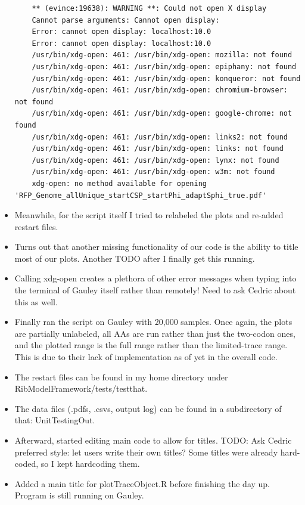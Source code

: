 \documentclass[12pt,hyperref]{labbook}
\newcommand{\sep}{\discretionary{}{}{}} %
\begin{document}
\begin{itemize}
\begin{lstlisting}
    ** (evince:19638): WARNING **: Could not open X display
    Cannot parse arguments: Cannot open display: 
    Error: cannot open display: localhost:10.0
    Error: cannot open display: localhost:10.0
    /usr/bin/xdg-open: 461: /usr/bin/xdg-open: mozilla: not found
    /usr/bin/xdg-open: 461: /usr/bin/xdg-open: epiphany: not found
    /usr/bin/xdg-open: 461: /usr/bin/xdg-open: konqueror: not found
    /usr/bin/xdg-open: 461: /usr/bin/xdg-open: chromium-browser: not found
    /usr/bin/xdg-open: 461: /usr/bin/xdg-open: google-chrome: not found
    /usr/bin/xdg-open: 461: /usr/bin/xdg-open: links2: not found
    /usr/bin/xdg-open: 461: /usr/bin/xdg-open: links: not found
    /usr/bin/xdg-open: 461: /usr/bin/xdg-open: lynx: not found
    /usr/bin/xdg-open: 461: /usr/bin/xdg-open: w3m: not found
    xdg-open: no method available for opening 'RFP_Genome_allUnique_startCSP_startPhi_adaptSphi_true.pdf'
    \end{lstlisting}
    \item Meanwhile, for the script itself I tried to relabeled the plots and re-added restart files.
    \item Turns out that another missing functionality of our code is the ability to title most of our plots. 
    Another TODO after I finally get this running.
    \item Calling xdg-open creates a plethora of other error messages when typing into the terminal of Gauley itself rather than remotely! 
    Need to ask Cedric about this as well.
    \item Finally ran the script on Gauley with 20,000 samples.
    Once again, the plots are partially unlabeled, all AAs are run rather than just the two-codon ones, and the plotted range is the full range rather than the limited-trace range.
    This is due to their lack of implementation as of yet in the overall code.
    \item The restart files can be found in my home directory under Rib\sep Model\sep Framework\sep/\sep tests\sep /\sep testthat\sep.
    \item The data files (.pdfs, .csvs, output log) can be found in a subdirectory of that: Unit\sep Testing\sep Out.
    \item Afterward, started editing main code to allow for titles.
    TODO: Ask Cedric preferred style: let users write their own titles?
    Some titles were already hard-coded, so I kept hardcoding them.
    \item Added a main title for plotTraceObject.R before finishing the day up.
    Program is still running on Gauley.
\end{itemize}
\end{document}
